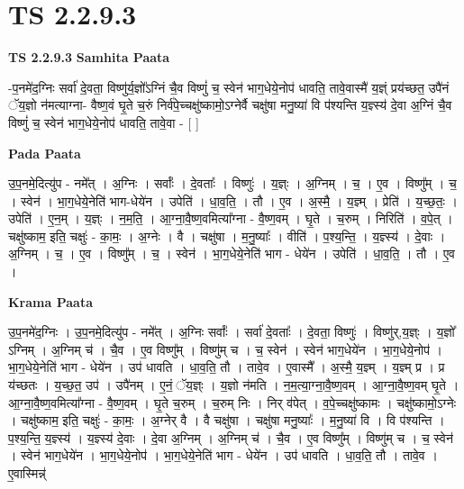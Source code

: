 \documentclass[17pt]{extarticle}
\begin{document}
\section*{ TS 2.2.9.3 }

\textbf{TS 2.2.9.3 } \newline
\textbf{Samhita Paata} \newline

-प॒नमे॑द॒ग्निः सर्वा॑ दे॒वता॒ विष्णु॑र्य॒ज्ञो᳚ऽग्निं चै॒व विष्णुं॑ च॒ स्वेन॑ भाग॒धेये॒नोप॑ धावति॒ तावे॒वास्मै॑ य॒ज्ञ्ं प्रय॑च्छत॒ उपै॑नं ॅय॒ज्ञो न॑मत्याग्ना- वैष्ण॒वं घृ॒ते च॒रुं निर्व॑पे॒च्चक्षु॑ष्कामो॒ऽग्नेर्वै चक्षु॑षा मनु॒ष्या॑ वि प॑श्यन्ति य॒ज्ञ्स्य॑ दे॒वा अ॒ग्निं चै॒व विष्णुं॑ च॒ स्वेन॑ भाग॒धेये॒नोप॑ धावति॒ तावे॒वा - [  ] \newline

\textbf{Pada Paata} \newline

उ॒प॒नमे॒दित्यु॑प - नमे᳚त् । अ॒ग्निः । सर्वाः᳚ । दे॒वताः᳚ । विष्णुः॑ । य॒ज्ञ्ः । अ॒ग्निम् । च॒ । ए॒व । विष्णु᳚म् । च॒ । स्वेन॑ । भा॒ग॒धेये॒नेति॑ भाग-धेये॑न । उपेति॑ । धा॒व॒ति॒ । तौ । ए॒व । अ॒स्मै॒ । य॒ज्ञ्म् । प्रेति॑ । य॒च्छ॒तः॒ । उपेति॑ । ए॒न॒म् । य॒ज्ञ्ः । न॒म॒ति॒ । आ॒ग्ना॒वै॒ष्ण॒वमित्या᳚ग्ना - वै॒ष्ण॒वम् । घृ॒ते । च॒रुम् । निरिति॑ । व॒पे॒त् । चक्षु॑ष्काम॒ इति॒ चक्षुः॑ - का॒मः॒ । अ॒ग्नेः । वै । चक्षु॑षा । म॒नु॒ष्याः᳚ । वीति॑ । प॒श्य॒न्ति॒ । य॒ज्ञ्स्य॑ । दे॒वाः । अ॒ग्निम् । च॒ । ए॒व । विष्णु᳚म् । च॒ । स्वेन॑ । भा॒ग॒धेये॒नेति॑ भाग - धेये॑न । उपेति॑ । धा॒व॒ति॒ । तौ । ए॒व ।  \newline


\textbf{Krama Paata} \newline

उ॒प॒नमे॑द॒ग्निः । उ॒प॒नमे॒दित्यु॑प - नमे᳚त् । अ॒ग्निः सर्वाः᳚ । सर्वा॑ दे॒वताः᳚ । दे॒वता॒ विष्णुः॑ । विष्णु॑र्,य॒ज्ञ्ः । य॒ज्ञो᳚ ऽग्निम् । अ॒ग्निम् च॑ । चै॒व । ए॒व विष्णु᳚म् । विष्णु॑म् च । च॒ स्वेन॑ । स्वेन॑ भाग॒धेये॑न । भा॒ग॒धेये॒नोप॑ । भा॒ग॒धेये॒नेति॑ भाग - धेये॑न । उप॑ धावति । धा॒व॒ति॒ तौ । तावे॒व । ए॒वास्मै᳚ । अ॒स्मै॒ य॒ज्ञ्म् । य॒ज्ञ्म् प्र । प्र य॑च्छतः । य॒च्छ॒त॒ उप॑ । उपै॑नम् । ए॒नं॒ ॅय॒ज्ञ्ः । य॒ज्ञो न॑मति । न॒म॒त्या॒ग्ना॒वै॒ष्ण॒वम् । आ॒ग्ना॒वै॒ष्ण॒वम् घृ॒ते । आ॒ग्ना॒वै॒ष्ण॒वमित्या᳚ग्ना - वै॒ष्ण॒वम् । घृ॒ते च॒रुम् । च॒रुम् निः । निर् व॑पेत् । व॒पे॒च्चक्षु॑ष्कामः । चक्षु॑ष्कामो॒ऽग्नेः । चक्षु॑ष्काम॒ इति॒ चक्षुः॑ - का॒मः॒ । अ॒ग्नेर् वै । वै चक्षु॑षा । चक्षु॑षा मनु॒ष्याः᳚ । म॒नु॒ष्या॑ वि । वि प॑श्यन्ति । प॒श्य॒न्ति॒ य॒ज्ञ्स्य॑ । य॒ज्ञ्स्य॑ दे॒वाः । दे॒वा अ॒ग्निम् । अ॒ग्निम् च॑ । चै॒व । ए॒व विष्णु᳚म् । विष्णु॑म् च । च॒ स्वेन॑ । स्वेन॑ भाग॒धेये॑न । भा॒ग॒धेये॒नोप॑ । भा॒ग॒धेये॒नेति॑ भाग - धेये॑न । उप॑ धावति । धा॒व॒ति॒ तौ । तावे॒व । ए॒वास्मिन्न्॑ \newline
\end{document}
